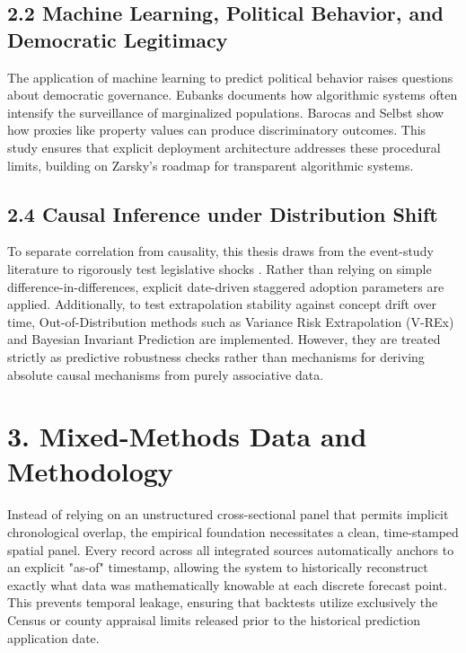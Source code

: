 \subsection*{2.2 Machine Learning, Political Behavior, and Democratic Legitimacy}
The application of machine learning to predict political behavior raises questions about democratic governance. Eubanks \cite{eubanks2018} documents how algorithmic systems often intensify the surveillance of marginalized populations. Barocas and Selbst \cite{barocas2016} show how proxies like property values can produce discriminatory outcomes. This study ensures that explicit deployment architecture addresses these procedural limits, building on Zarsky's \cite{zarsky2016} roadmap for transparent algorithmic systems.

\subsection*{2.4 Causal Inference under Distribution Shift}
To separate correlation from causality, this thesis draws from the event-study literature to rigorously test legislative shocks \cite{callaway2021difference}. Rather than relying on simple difference-in-differences, explicit date-driven staggered adoption parameters are applied. Additionally, to test extrapolation stability against concept drift over time, Out-of-Distribution methods such as Variance Risk Extrapolation (V-REx) \cite{krueger2021} and Bayesian Invariant Prediction \cite{wu2025bayesian} are implemented. However, they are treated strictly as predictive robustness checks rather than mechanisms for deriving absolute causal mechanisms from purely associative data.

\section*{3. Mixed-Methods Data and Methodology}
Instead of relying on an unstructured cross-sectional panel that permits implicit chronological overlap, the empirical foundation necessitates a clean, time-stamped spatial panel. Every record across all integrated sources automatically anchors to an explicit "as-of" timestamp, allowing the system to historically reconstruct exactly what data was mathematically knowable at each discrete forecast point. This prevents temporal leakage, ensuring that backtests utilize exclusively the Census or county appraisal limits released prior to the historical prediction application date.

